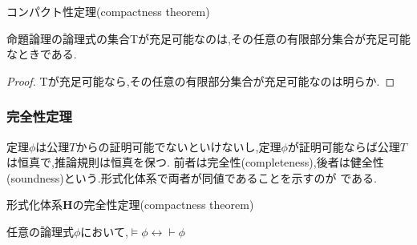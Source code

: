 \begin{thm}
 コンパクト性定理(compactness theorem)

 命題論理の論理式の集合Tが充足可能なのは,その任意の有限部分集合が充足可能なときである.

\end{thm}
\begin{proof}
 Tが充足可能なら,その任意の有限部分集合が充足可能なのは明らか.
\end{proof}

\subsubsection{完全性定理}
定理$\phi$は公理$T$からの証明可能でないといけないし,定理$\phi$が証明可能ならば公理$T$は恒真で,推論規則は恒真を保つ.
前者は完全性(completeness),後者は健全性(soundness)という.形式化体系で両者が同値であることを示すのが
である.

\begin{thm}
 形式化体系$\bm{H}$の完全性定理(compactness theorem)

 任意の論理式$\phi$において,$\models \phi \leftrightarrow \vdash \phi$
\end{thm}

